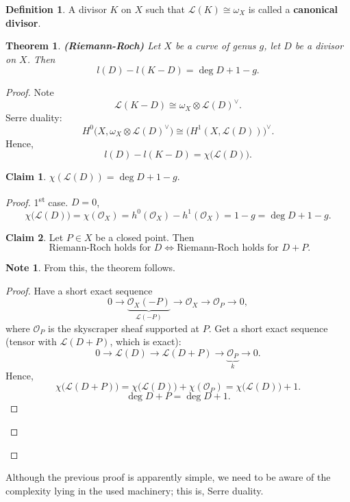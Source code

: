 \documentclass[12pt]{article}
\newtheorem*{theorem}{Theorem}
\theoremstyle{definition}
\newtheorem*{definition}{Definition}
\newtheorem*{note}{Note}
\newtheorem*{claim}{Claim}
\begin{document}
\begin{definition}
A divisor $K$ on $X$ such that $\mathcal L(K)\cong\omega_X$ is called a \textbf{canonical divisor}.
\end{definition}

\begin{theorem}
\emph{\textbf{(Riemann-Roch)}} Let $X$ be a curve of genus $g$, let $D$ be a divisor on $X$. Then
\[l(D)-l(K-D)=\deg D+1-g.\]
\end{theorem}

\begin{proof}
Note
\[\mathcal L(K-D)\cong\omega_X\otimes\mathcal L(D)^\vee.\]
Serre duality:
\[H^0\big(X,\omega_X\otimes\mathcal L(D)^\vee\big)\cong\big(H^1(X,\mathcal L(D))\big)^\vee.\]
Hence,
\[l(D)-l(K-D)=\chi\big(\mathcal L(D)\big).\]
\begin{claim}
$\chi(\mathcal L(D))=\deg D+1-g$.
\end{claim}
\begin{proof}
1\textsuperscript{st} case. $D=0$,
\[\chi\big(\mathcal L(D)\big)=\chi(\mathcal O_X)=h^0(\mathcal O_X)-h^1(\mathcal O_X)=1-g=\deg D+1-g.\]
\begin{claim}
Let $P\in X$ be a closed point. Then
\[\text{ Riemann-Roch holds for }D\Longleftrightarrow\text{Riemann-Roch holds for }D+P.\]
\end{claim}
\begin{note}
From this, the theorem follows.
\end{note}
\begin{proof}
Have a short exact sequence
\[0\longrightarrow\underbrace{\mathcal O_X(-P)}_{\mathcal L(-P)}\longrightarrow\mathcal O_X\longrightarrow\mathcal O_P\longrightarrow0,\]
where $\mathcal O_P$ is the skyscraper sheaf supported at $P$. Get a short exact sequence (tensor with $\mathcal L(D+P)$, which is exact):
\[0\longrightarrow\mathcal L(D)\longrightarrow\mathcal L(D+P)\longrightarrow\underbrace{\mathcal O_P}_k\longrightarrow0.\]
Hence,
\[\chi\big(\mathcal L(D+P)\big)=\chi\big(\mathcal L(D)\big)+\chi(\mathcal O_P)=\chi\big(\mathcal L(D)\big)+1.\]
\[\deg D+P=\deg D+1.\]
\end{proof}
\end{proof}
\end{proof}

Although the previous proof is apparently simple, we need to be aware of the complexity lying in the used machinery; this is, Serre duality.
\end{document}
